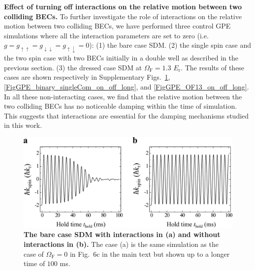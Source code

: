 \documentclass[showpacs,preprintnumbers,amsmath,amssymb, superscriptaddress, aps, reprint]{revtex4-1}
\def\E_r{E_{\text{r}}}
\def\OmegaF{\Omega_{\text{F}}}
\begin{document}
{{\vspace{5mm}
\noindent
\textbf{Effect of turning off interactions on the relative motion between two colliding BECs.} To further investigate the role of interactions on the relative motion between two colliding BECs, we have performed three control GPE simulations where all the interaction parameters are set to zero (i.e. $g={g_{ \uparrow  \uparrow }}={g_{ \downarrow  \downarrow }}={g_{ \uparrow  \downarrow }}=0$): (1) the bare case SDM. (2) the single spin case and the two spin case with two BECs initially in a double well as described in the previous section. (3) the dressed case SDM at $\OmegaF=1.3$ $\E_r$. The results of these cases are shown respectively in Supplementary Figs.~\ref{FigGPE_OF00_on_off_long}, \ref{FigGPE_binary_singleCom_on_off_long}, and \ref{FigGPE_OF13_on_off_long}. In all these non-interacting cases, we find that the relative motion between the two colliding BECs has no noticeable damping within the time of simulation. This suggests that interactions are essential for the damping mechanisms studied in this work. 

\begin{figure}[H]
\centering
\includegraphics[width=5.0in]{SI_Fig6_OF00_on_off_long_Vfinal.pdf}
\caption{\textbf{The bare case SDM with interactions in (a) and without interactions in (b).} The case (a) is the same simulation as the case of $\OmegaF=0$ in {Fig.~6c in the main text} but shown up to a longer time of $100$ ms.}
\label{FigGPE_OF00_on_off_long}
\end{figure}

}}
\end{document}
